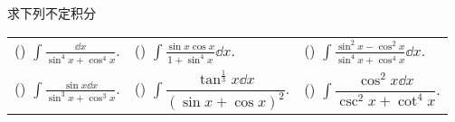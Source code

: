 \begin{example}
    求下列不定积分
    \setcounter{magicrownumbers}{0}
    \begin{table}[H]
        \centering
        \begin{tabular}{l | l | l}
            (\rownumber{}) $\displaystyle\int\frac{\dd x}{\sin^4x+\cos^4x}.$       & (\rownumber{}) $\displaystyle\int\frac{\sin x\cos x}{1+\sin^4x}\dd x.$                 & (\rownumber{}) $\displaystyle\int\frac{\sin^2x-\cos^2x}{\sin^4x+\cos^4x}\dd x.$ \\
            (\rownumber{}) $\displaystyle\int\frac{\sin x\dd x}{\sin^3x+\cos^3x}.$ & (\rownumber{}) $\displaystyle\int\dfrac{\tan^{\frac{1}{3}}x\dd x}{(\sin x+\cos x)^2}.$ & (\rownumber{}) $\displaystyle\int\dfrac{\cos^2x\dd x}{\csc^2x+\cot^4x}.$
        \end{tabular}
    \end{table}
\end{example}
